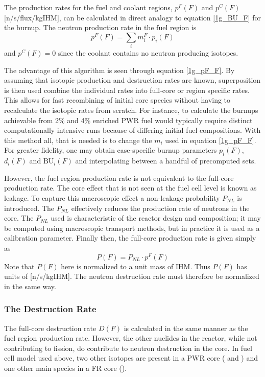 The production rates for the fuel and coolant regions, $p^F(F)$ and $p^C(F)$ [n/s/flux/kgIHM], 
can be calculated in direct analogy to equation \ref{1g_BU_F} for the burnup.  The neutron production 
rate in the fuel region is 
\begin{equation}
\label{1g_pF_F}
p^F(F) = \sum_i m_i^F \cdot p_i(F)
\end{equation}
and $p^C(F) = 0$ since the coolant contains no neutron producing isotopes.  

The advantage of this algorithm is seen through equation \ref{1g_pF_F}.  By assuming that isotopic 
production and destruction rates are known, superposition is then used combine the individual rates 
into full-core or region specific rates.  This allows for fast recombining of initial core species without 
having to recalculate the isotopic rates from scratch.  For instance, to calculate the burnups achievable 
from 2\% and 4\%  enriched PWR fuel would typically require distinct computationally intensive 
runs because of differing initial fuel compositions.  With this method all, that is needed is to change the 
$m_i$ used in equation \ref{1g_pF_F}.   For greater fidelity, one may obtain case-specific burnup parameters $p_i(F)$, 
$d_i(F)$ and $\mbox{BU}_i(F)$ and interpolating between a handful of precomputed sets.  

However, the fuel region production rate is not equivalent to the full-core production rate.  The 
core effect that is not seen at the fuel cell level is known as leakage.  To capture this macroscopic effect a 
non-leakage probability $P_{NL}$ is introduced.  The $P_{NL}$ effectively reduces the production rate of 
neutrons in the core. The $P_{NL}$ used is characteristic of the reactor design and composition; it may 
be computed using macroscopic transport methods, but in practice it is used as a calibration parameter.  
Finally then, the full-core production rate is given simply as 
\begin{equation}
\label{1g_P_F}
P(F) = P_{NL} \cdot p^F(F)
\end{equation}
Note that $P(F)$ here is normalized to a unit mass of IHM.  Thus $P(F)$ has units of [n/s/kgIHM].
The neutron destruction rate must therefore be normalized in the same way.



\subsubsection{The Destruction Rate}
\label{1g_sec:d_rate}
The full-core destruction rate $D(F)$ is calculated in the same manner as the fuel 
region production rate.  However, the other nuclides in the reactor, while not contributing 
to fission, do contribute to neutron destruction in the core.  In fuel cell model used above, 
two other isotopes are present in a PWR core ( and ) and one other main species 
in a FR core ().

